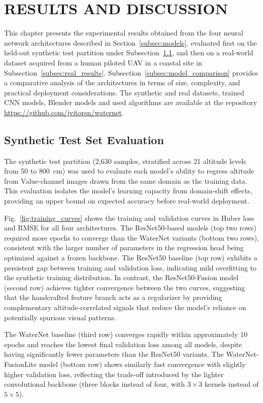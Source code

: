 \section{RESULTS AND DISCUSSION}

This chapter presents the experimental results obtained from the four neural network architectures described in Section~\ref{subsec:models}, evaluated first on the held-out synthetic test partition under Subsection~\ref{subsec:synth_results}, and then on a real-world dataset acquired from a human piloted UAV in a coastal site in Subsection~\ref{subsec:real_results}. Subsection~\ref{subsec:model_comparison} provides a comparative analysis of the architectures in terms of size, complexity, and practical deployment considerations. The synthetic and real datasets, trained CNN models, Blender models and used algorithms are available at the repository \url{https://github.com/jvitorsn/waternet}.

\subsection{Synthetic Test Set Evaluation}
\label{subsec:synth_results}

The synthetic test partition (2{,}630 samples, stratified across 21 altitude levels from 50 to 800~cm) was used to evaluate each model's ability to regress altitude from Value-channel images drawn from the same domain as the training data. This evaluation isolates the model's learning capacity from domain-shift effects, providing an upper bound on expected accuracy before real-world deployment.

Fig.~\ref{fig:training_curves} shows the training and validation curves in Huber loss and RMSE for all four architectures. The ResNet50-based models (top two rows) required more epochs to converge than the WaterNet variants (bottom two rows), consistent with the larger number of parameters in the regression head being optimized against a frozen backbone. The ResNet50 baseline (top row) exhibits a persistent gap between training and validation loss, indicating mild overfitting to the synthetic training distribution. In contrast, the ResNet50-Fusion model (second row) achieves tighter convergence between the two curves, suggesting that the handcrafted feature branch acts as a regularizer by providing complementary altitude-correlated signals that reduce the model's reliance on potentially spurious visual patterns.

The WaterNet baseline (third row) converges rapidly within approximately 10 epochs and reaches the lowest final validation loss among all models, despite having significantly fewer parameters than the ResNet50 variants. The WaterNet-FusionLite model (bottom row) shows similarly fast convergence with slightly higher validation loss, reflecting the trade-off introduced by the lighter convolutional backbone (three blocks instead of four, with $3\times3$ kernels instead of $5\times5$).

